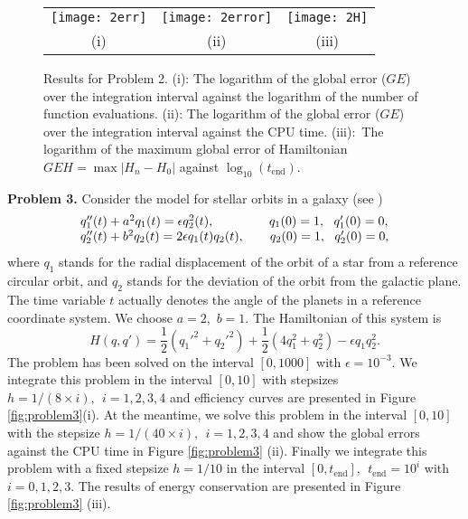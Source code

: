 \documentclass{article}
\begin{document}
\begin{figure}[ptbh]
\centering\tabcolsep=1mm
\begin{tabular}
[c]{ccc}%
\texttt{[image: 2err]} &\texttt{[image: 2error]} &\texttt{[image: 2H]}\\
{\small (i)} & {\small (ii)} & {\small (iii)}%
\end{tabular}
\caption{Results for Problem 2. (i): The logarithm of the global
error ($GE$) over the integration interval against the logarithm of
the number of function evaluations. (ii): The logarithm of the
global error ($GE$) over the integration interval against the CPU
time. (iii):\ The logarithm of the maximum global error of
Hamiltonian
$GEH=\max|H_{n}-H_{0}|$ against $\log_{10}(t_{\mathrm{end}})$.}%
\label{fig:problem2}%
\end{figure}



\noindent\vskip3mm \noindent\textbf{Problem 3.} Consider the model
for stellar orbits in a galaxy (see
\cite{Kevorkian1981,Kevorkian1996})
\begin{equation*}\begin{array}
[c]{ll} q''_{1}(t)+a^{2}q_{1}(t)=\epsilon q_{2}^{2}(t),\qquad\qquad\
q_{1}(0)=1,\ \
q'_{1}(0)=0,\\
q''_{2}(t)+b^{2}q_{2}(t)=2\epsilon q_{1}(t)q_{2}(t),\qquad
q_{2}(0)=1,\ \
q'_{2}(0)=0,\\
\end{array}
\label{prooo}%
\end{equation*}
where $q_{1}$ stands for the radial displacement of the orbit of a
star from a reference circular orbit, and $q_{2}$ stands for the
deviation of the orbit from the galactic plane. The time variable
$t$ actually denotes the angle of the planets in a reference
coordinate system. We choose $a=2,$ $b=1.$ The Hamiltonian of this
system is
\begin{equation*}
H(q,q')=\dfrac{1}{2}(q_{1}'^{2}+q_{2}'^{2})+\dfrac{1}{2}(4q_{1}^2+q_{2}^2)-\epsilon
q_{1}q_{2}^{2}.
\end{equation*}
The problem has been solved on the interval $[0,1000]$ with
$\epsilon=10^{-3}.$    We integrate this problem in the interval
$[0,10]$ with stepsizes $h=1/(8\times i), \ \ i=1,2,3,4$ and
efficiency curves  are presented in Figure \ref{fig:problem3}(i). At
the meantime, we solve this problem in the interval $[0,10]$ with
the stepsize $h=1/(40\times i),\ \ i=1,2,3,4$ and show the global
errors against the CPU time in Figure \ref{fig:problem3} (ii).
Finally we integrate this problem with a fixed stepsize $h=1/10$ in
the interval $[0,t_{\mathrm{end}}],\ \ t_{\mathrm{end}}=10^{i}$ with
$i=0,1,2,3$. The results of energy conservation are presented in
Figure \ref{fig:problem3} (iii).
\end{document}
